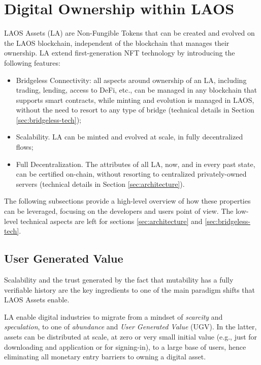 \section{Digital Ownership within LAOS}\label{laos-assets}

LAOS Assets (LA) are Non-Fungible Tokens that can be created and evolved on the LAOS blockchain,
independent of the blockchain that manages their ownership. 
LA extend first-generation NFT technology by introducing the following features:
\begin{itemize}
    \item Bridgeless Connectivity: all aspects around ownership of an LA, including
    trading, lending, access to DeFi, etc., can be managed in any blockchain that supports smart contracts,
    while minting and evolution is managed in LAOS, without the need to resort to any type of bridge
    (technical details in Section \ref{sec:bridgeless-tech});
    \item Scalability. LA can be minted and evolved at scale, in fully decentralized flows;
    \item Full Decentralization. The attributes of all LA, now, and in every past state, can be certified on-chain, without 
    resorting to centralized privately-owned servers (technical details in Section \ref{sec:architecture}).
\end{itemize}

The following subsections provide a high-level overview of how these 
properties can be leveraged, focusing on the developers and users
point of view. The low-level technical
aspects are left for sections \ref{sec:architecture} and  \ref{sec:bridgeless-tech}.

\subsection{User Generated Value}\label{sec:ugv}

Scalability and the trust generated by the fact that 
mutability has a fully verifiable history are the key ingredients 
to one of the main paradigm shifts that LAOS Assets enable.

LA enable digital industries to migrate from a mindset of {\it scarcity} and {\it speculation},
to one of {\it abundance} and {\it User Generated Value} (UGV). In the latter, 
assets can be distributed at scale, at zero or very small initial value
(e.g., just for downloading and application or for signing-in), to a large base of users, hence 
eliminating all monetary entry barriers to owning a digital asset.


